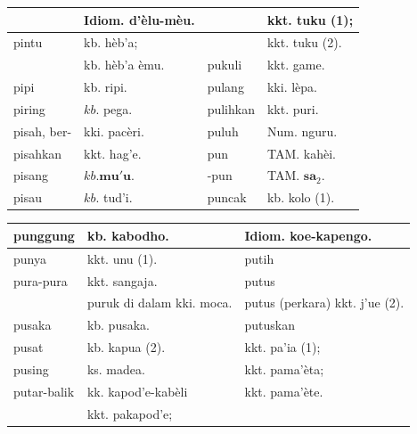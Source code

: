 \documentclass[10pt]{article}
\begin{document}
\begin{center}
\begin{tabular}{|l|l|l|l|}
\hline
 & Idiom. d'èlu-mèu. &  & kkt. tuku (1); \\
\hline
pintu & kb. hèb'a; &  & kkt. tuku (2). \\
\hline
 & kb. hèb'a èmu. & pukuli & kkt. game. \\
\hline
pipi & kb. ripi. & pulang & kki. lèpa. \\
\hline
piring & \(k b\). pega. & pulihkan & kkt. puri. \\
\hline
pisah, ber- & kki. pacèri. & puluh & Num. nguru. \\
\hline
pisahkan & kkt. hag'e. & pun & TAM. kahèi. \\
\hline
pisang & \(k b . \mathbf{m u ' u}\). & -pun & TAM. \(\mathbf{s a}_{2}\). \\
\hline
pisau & \(k b\). tud'i. & puncak & kb. kolo (1). \\
\hline
\end{tabular}
\end{center}

\begin{center}
\begin{tabular}{|l|l|l|}
\hline
punggung & kb. kabodho. & Idiom. koe-kapengo. \\
\hline
punya & kkt. unu (1). & putih \\
\hline
pura-pura & kkt. sangaja. & putus \\
\hline
 & puruk di dalam kki. moca. & putus (perkara) kkt. j'ue (2). \\
\hline
pusaka & kb. pusaka. & putuskan \\
\hline
pusat & kb. kapua (2). & kkt. pa'ia (1); \\
\hline
pusing & ks. madea. & kkt. pama'èta; \\
\hline
putar-balik & kk. kapod'e-kabèli & kkt. pama'ète. \\
\hline
 & kkt. pakapod'e; &  \\
\hline
\end{tabular}
\end{center}
\end{document}
